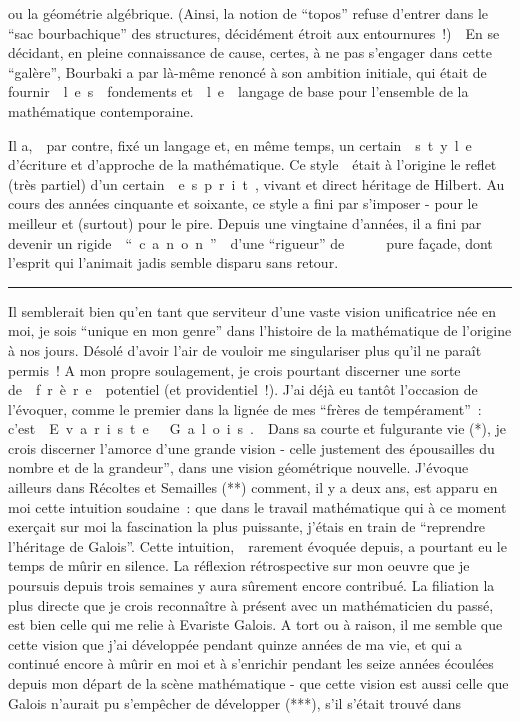 \noindent ou la géométrie algébrique. (Ainsi, la notion de ``topos'' refuse d'entrer dans le ``sac bourbachique'' des structures, décidément étroit aux entournures~!)\ \ En se décidant, en pleine connaissance de cause, certes, à ne pas s'engager dans cette ``galère'', Bourbaki a par là-même renoncé à son ambition initiale, qui était de fournir\ \ \mbox{l e s}\ \ fondements et\ \ \mbox{l e}\ \ langage de base pour l'ensemble de la mathématique contemporaine.

\noindent\hspace*{2em}Il a,\ \ par contre, fixé un langage et, en même temps, un certain\ \ \mbox{s t y l e} d'écriture et d'approche de la mathématique. Ce style\ \ était à l'origine le reflet (très partiel) d'un certain\ \ \mbox{e s p r i t ,} vivant et direct héritage de Hilbert. Au cours des années cinquante et soixante, ce style a fini par s'imposer - pour le meilleur et (surtout) pour le pire. Depuis une vingtaine d'années, il a fini par devenir un rigide\ \ \mbox{`` c a n o n ''}\ \ d'une ``rigueur'' de\ \ \ \ \ \ pure façade, dont l'esprit qui l'animait jadis semble disparu sans retour.

\noindent\rule{0.15\linewidth}{0.45pt}\par\medskip

\noindent\hspace*{3em}Il semblerait bien qu'en tant que serviteur d'une vaste vision unificatrice née en moi, je sois ``unique en mon genre'' dans l'histoire de la mathématique de l'origine à nos jours. Désolé d'avoir l'air de vouloir me singulariser plus qu'il ne paraît permis~! A mon propre soulagement, je crois pourtant discerner une sorte de\ \ \mbox{f r è r e}\ \ potentiel (et providentiel~!). J'ai déjà eu tantôt l'occasion de l'évoquer, comme le premier dans la lignée de mes ``frères de tempérament''~: c'est\ \ \mbox{E v a r i s t e\ \ \ G a l o i s .}\ \ Dans sa courte et fulgurante vie (*), je crois discerner l'amorce d'une grande vision - celle justement des épousailles du nombre et de la grandeur'', dans une vision géométrique nouvelle. J'évoque ailleurs dans Récoltes et Semailles (**) comment, il y a deux ans, est apparu en moi cette intuition soudaine~: que dans le travail mathématique qui à ce moment exerçait sur moi la fascination la plus puissante, j'étais en train de ``reprendre l'héritage de Galois''. Cette intuition,\ \ rarement évoquée depuis, a pourtant eu le temps de mûrir en silence. La réflexion rétrospective sur mon oeuvre que je poursuis depuis trois semaines y aura sûrement encore contribué. La filiation la plus directe que je crois reconnaître à présent avec un mathématicien du passé, est bien celle qui me relie à Evariste Galois. A tort ou à raison, il me semble que cette vision que j'ai développée pendant quinze années de ma vie, et qui a continué encore à mûrir en moi et à s'enrichir pendant les seize années écoulées depuis mon départ de la scène mathématique - que cette vision est aussi celle que Galois n'aurait pu s'empêcher de développer (***), s'il s'était trouvé dans

